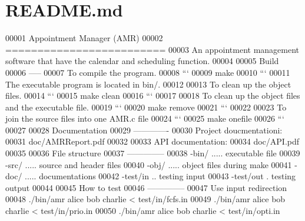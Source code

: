 \section{R\+E\+A\+D\+M\+E.\+md}

\begin{DoxyCode}
00001 Appointment Manager (AMR)
00002 =========================
00003 An appointment management software that have the calendar and scheduling function.
00004 
00005 Build
00006 -----
00007 To compile the program.
00008 ```
00009 make
00010 ```
00011 The executable program is located in bin/.
00012 
00013 To clean up the object files.
00014 ```
00015 make clean
00016 ```
00017 
00018 To clean up the object files and the executable file.
00019 ```
00020 make remove
00021 ```
00022 
00023 To join the source files into one AMR.c file
00024 ```
00025 make onefile
00026 ```
00027 
00028 Documentation
00029 -------------
00030 Project doucmentationi:
00031 doc/AMRReport.pdf
00032 
00033 API documentation:
00034 doc/API.pdf
00035 
00036 File structure
00037 --------------
00038 -bin/ ..... executable file
00039 -src/ ..... source and header files
00040 -obj/ ..... object files during make
00041 -doc/ ..... documentations
00042 -test/in .. testing input
00043 -test/out . testing output
00044 
00045 How to test
00046 --------------
00047 Use input redirection
00048 ./bin/amr alice bob charlie < test/in/fcfs.in
00049 ./bin/amr alice bob charlie < test/in/prio.in
00050 ./bin/amr alice bob charlie < test/in/opti.in
\end{DoxyCode}
